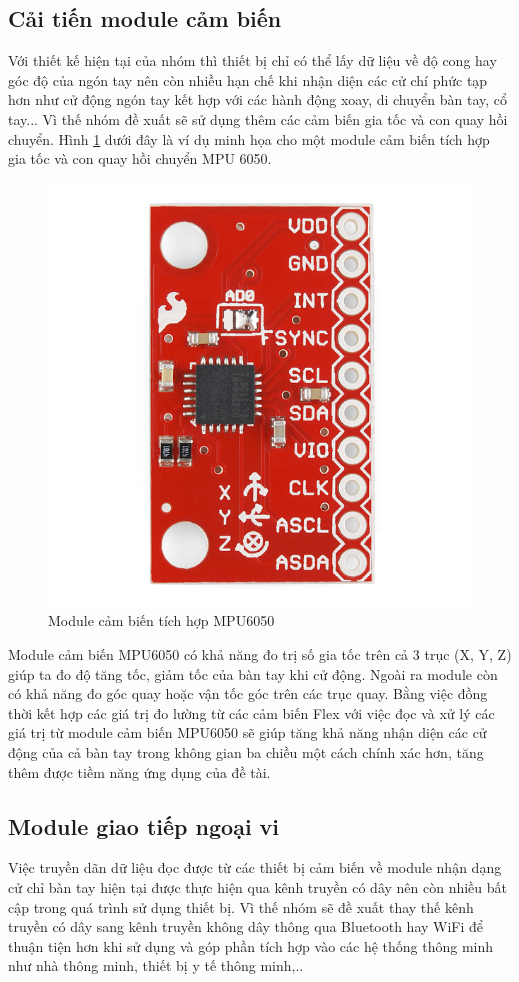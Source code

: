 \subsection{Cải tiến module cảm biến}
\incident Với thiết kế hiện tại của nhóm thì thiết bị chỉ có thể lấy dữ liệu về độ cong hay góc độ của ngón tay nên còn nhiều hạn chế khi nhận diện các cử chí phức tạp hơn như cử động ngón tay kết hợp với các hành động xoay, di chuyển bàn tay, cổ tay... Vì thế nhóm đề xuất sẽ sử dụng thêm các cảm biến gia tốc và con quay hồi chuyển. Hình \ref{fig:MPU6050} dưới đây là ví dụ minh họa cho một module cảm biến tích hợp gia tốc và con quay hồi chuyển MPU 6050.
\begin{figure}[H]
    \centering
    \includegraphics{Images/Theoretical basis/MPU6050.jpg}
    \caption{Module cảm biến tích hợp MPU6050}
    \label{fig:MPU6050}
\end{figure}
\incident Module cảm biến MPU6050 có khả năng đo trị số gia tốc trên cả 3 trục (X, Y, Z) giúp ta đo độ tăng tốc, giảm tốc của bàn tay khi cử động. Ngoài ra module còn có khả năng đo góc quay hoặc vận tốc góc trên các trục quay. Bằng việc đồng thời kết hợp các giá trị đo lường từ các cảm biến Flex với việc đọc và xử lý các giá trị từ module cảm biến MPU6050 sẽ giúp tăng khả năng nhận diện các cử động của cả bàn tay trong không gian ba chiều một cách chính xác hơn, tăng thêm được tiềm năng ứng dụng của đề tài.

\subsection{Module giao tiếp ngoại vi}
\incident Việc truyền dãn dữ liệu đọc được từ các thiết bị cảm biến về module nhận dạng cử chỉ bàn tay hiện tại được thực hiện qua kênh truyền có dây nên còn nhiều bất cập trong quá trình sử dụng thiết bị. Vì thế nhóm sẽ đề xuất thay thế kênh truyền có dây sang kênh truyền không dây thông qua Bluetooth hay WiFi để thuận tiện hơn khi sử dụng và góp phần tích hợp vào các hệ thống thông minh như nhà thông minh, thiết bị y tế thông minh,..
